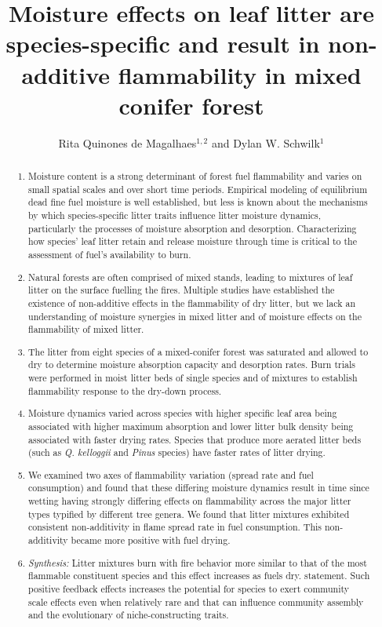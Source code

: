 \documentclass[letterpaper,12pt]{article}
\title{Moisture effects on leaf litter are species-specific and result in non-additive flammability in mixed conifer forest}
\author{Rita Quinones de Magalhaes$^{1,2}$ and Dylan W. Schwilk$^1$}
\begin{document}
\maketitle

\begin{abstract}
  \noindent \begin{enumerate}
    
  \item Moisture content is a strong determinant of forest fuel flammability
  and varies on small spatial scales and over short time periods. Empirical
  modeling of equilibrium dead fine fuel moisture is well established, but less
  is known about the mechanisms by which species-specific litter traits
  influence litter moisture dynamics, particularly the processes of moisture
  absorption and desorption. Characterizing how species’ leaf litter retain and
  release moisture through time is critical to the assessment of fuel’s
  availability to burn.
  \item Natural forests are often comprised of
  mixed stands, leading to mixtures of leaf litter on the surface fuelling the
  fires. Multiple studies have established the existence of non-additive
  effects in the flammability of dry litter, but we lack an understanding of
  moisture synergies in mixed litter and of moisture effects on the
  flammability of mixed litter.
  \item The litter from eight species of a
  mixed-conifer forest was saturated and allowed to dry to determine moisture
  absorption capacity and desorption rates. Burn trials were performed in moist
  litter beds of single species and of mixtures to establish flammability
  response to the dry-down process.
  \item Moisture dynamics varied across species with
  higher specific leaf area being associated with higher maximum absorption and
  lower litter bulk density being associated with faster drying rates. Species
  that produce more aerated litter beds (such as \emph{Q. kelloggii} and
  \emph{Pinus} species) have faster rates of litter drying.
  \item We examined two
  axes of flammability variation (spread rate and fuel consumption) and found
  that these differing moisture dynamics result in time since wetting having
  strongly differing effects on flammability across the major litter types
  typified by different tree genera. We found that litter mixtures
  exhibited consistent non-additivity in flame spread rate in fuel consumption.
  This non-additivity became more positive with fuel drying.
    \item \emph{Synthesis:} Litter mixtures burn with fire
  behavior more similar to that of the most flammable constituent species and
  this effect increases as fuels dry. statement. Such positive feedback effects
  increases the potential for species to exert community scale effects even
  when relatively rare and that can influence community assembly and the
  evolutionary of niche-constructing traits.
  \end{enumerate}
\end{abstract}
\end{document}
